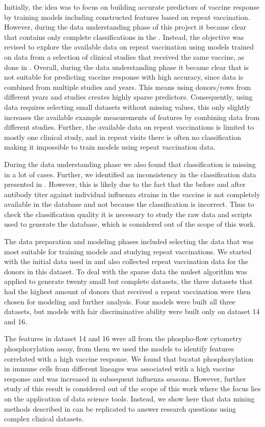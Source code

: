 Initially, the idea was to focus on building accurate predictors of vaccine response by training models including constructed features based on repeat vaccination. However, during the data understanding phase of this project it became clear that \flup contains only complete classifications in the \firstvis.
Instead, the objective was revised to explore the available data on repeat vaccination using models trained on \firstvis data from a selection of clinical studies that received the same vaccine, as done in \spaper.
Overall, during the data understanding phase it became clear that \flup is not suitable for predicting vaccine response with high accuracy, since data is combined from multiple studies and years.
This means using donors/rows from different years and studies creates highly sparse predictors.
Consequently, using \flup data requires selecting small datasets without missing values, this only slightly increases the available example measurements of features by combining data from different studies.
Further, the available data on repeat vaccinations is limited to mostly one clinical study, and in repeat visits there is often no classification making it impossible to train models using repeat vaccination data.

During the data understanding phase we also found that classification is missing in a lot of cases.
Further, we identified an inconsistency in the classification data presented in \flup.
However, this is likely due to the fact that the before and after antibody titer against individual influenza strains in the vaccine is not completely available in the database and not because the classification is incorrect.
Thus to check the classification quality it is necessary to study the raw data and scripts used to generate the database, which is considered out of the scope of this work.

The data preparation and modeling phases included selecting the data that was most suitable for training models and studying repeat vaccinations.
We started with the initial data used in \spaper and also collected repeat vaccination data for the donors in this dataset.
To deal with the sparse data the mulset algorithm was applied to generate twenty small but complete datasets, the three datasets that had the highest amount of donors that received a repeat vaccination were then chosen for modeling and further analysis.
Four models were built all three datasets, but models with fair discriminative ability were built only on dataset 14 and 16.

The features in dataset 14 and 16 were all from the phospho-flow cytometry phosphorylation assay, from them we used the models to identify features correlated with a high vaccine response.
We found that \gls{bu:stat} phosphorylation in immune cells from different lineages was associated with a high vaccine response and was increased in subsequent influenza seasons.
However, further study of this result is considered out of the scope of this work where the focus lies on the application of data science tools.
Instead, we show here that data mining methods described in \spaper can be replicated to answer research questions using complex clinical datasets.


